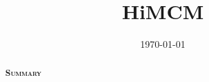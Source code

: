 \documentclass{class}
\title{HiMCM}
\date{\today}
\begin{document}
\begin{abstract}

\begin{center}
{\large\scshape\bfseries Summary}
\end{center}
\begin{changemargin}{0.5in}{0.5in} 

\end{changemargin} 

\end{abstract}

\maketitle



\tableofcontents

\newpage


















\newpage



{\scriptsize

}

\pagebreak


\end{document}

